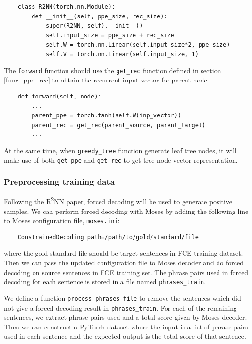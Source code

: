 \documentclass[12pt,a4paper,twoside,openright]{report}
\begin{document}
\begin{verbatim}
    class R2NN(torch.nn.Module):
        def __init__(self, ppe_size, rec_size):
            super(R2NN, self).__init__()
            self.input_size = ppe_size + rec_size
            self.W = torch.nn.Linear(self.input_size*2, ppe_size)
            self.V = torch.nn.Linear(self.input_size, 1)
\end{verbatim}

The \texttt{forward} function should use the \texttt{get\_rec} function defined in section \ref{func_ppe_rec} to obtain the recurrent input vector for parent node.

\begin{verbatim}
    def forward(self, node):
        ...
        parent_ppe = torch.tanh(self.W(inp_vector))
        parent_rec = get_rec(parent_source, parent_target)
        ...
\end{verbatim}

At the same time, when \texttt{greedy\_tree} function generate leaf tree nodes, it will make use of both \texttt{get\_ppe} and \texttt{get\_rec} to get tree node vector representation.

\subsubsection{Preprocessing training data}
Following the R\textsuperscript{2}NN paper\cite{r2nn}, forced decoding will be used to generate positive samples. We can perform forced decoding with Moses by adding the following line to Moses configuration file, \texttt{moses.ini}:
\begin{verbatim}
    ConstrainedDecoding path=/path/to/gold/standard/file
\end{verbatim}
where the gold standard file should be target sentences in FCE training dataset. Then we can pass the updated configuration file to Moses decoder and do forced decoding on source sentences in FCE training set. The phrase pairs used in forced decoding for each sentence is stored in a file named \texttt{phrases\_train}.

We define a function \texttt{process\_phrases\_file} to remove the sentences which did not give a forced decoding result in \texttt{phrases\_train}. For each of the remaining sentences, we extract phrase pairs used and a total score given by Moses decoder. Then we can construct a PyTorch dataset where the input is a list of phrase pairs used in each sentence and the expected output is the total score of that sentence.
\end{document}
